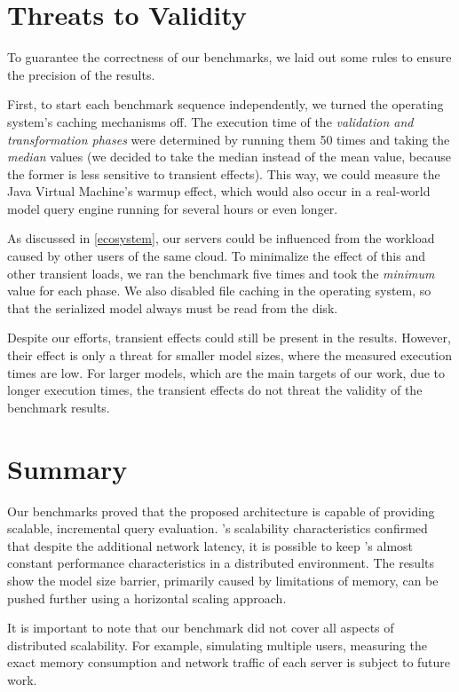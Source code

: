 \section{Threats to Validity}
\label{threats-to-validity}

To guarantee the correctness of our benchmarks, we laid out some rules to ensure the precision of the results.

First, to start each benchmark sequence independently, we turned the operating system's caching mechanisms off. The execution time of the \emph{validation and transformation phases} were determined by running them 50 times and taking the \emph{median} values (we decided to take the median instead of the mean value, because the former is less sensitive to transient effects). This way, we could measure the Java Virtual Machine's warmup effect, which would also occur in a real-world model query engine running for several hours or even longer.

As discussed in \autoref{ecosystem}, our servers could be influenced from the workload caused by other users of the same cloud. To minimalize the effect of this and other transient loads, we ran the benchmark five times and took the \emph{minimum} value for each phase. We also disabled file caching in the operating system, so that the serialized model always must be read from the disk.

Despite our efforts, transient effects could still be present in the results. However, their effect is only a threat for smaller model sizes, where the measured execution times are low. For larger models, which are the main targets of our work, due to longer execution times, the transient effects do not threat the validity of the benchmark results.


\section{Summary}

Our benchmarks proved that the proposed architecture is capable of providing scalable, incremental query evaluation.
\iqd{}'s scalability characteristics confirmed that despite the additional network latency, it is possible to keep \eiq{}'s almost constant performance characteristics in a distributed environment. The results show the model size barrier, primarily caused by limitations of memory, 
can be pushed further using a horizontal scaling approach.

It is important to note that our benchmark did not cover all aspects of distributed scalability. For example, simulating multiple users, measuring the exact memory consumption and network traffic of each server is subject to future work.


